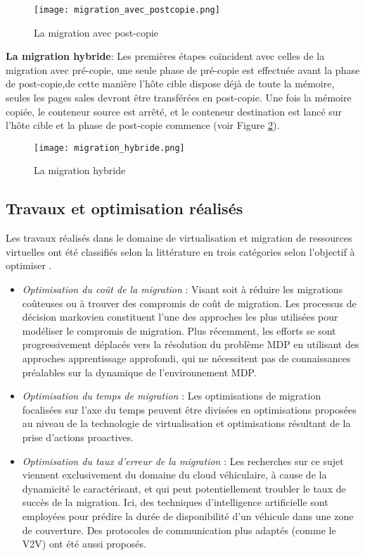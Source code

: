 \begin{figure}[H]
\centering
\texttt{[image: migration\_avec\_postcopie.png]}
\caption{La migration avec post-copie \cite{puliafito2019}}
\label{fig:migration_avec_postcopie2}
\end{figure}
\textbf{La migration hybride}: Les premières étapes coïncident avec celles de la migration avec pré-copie, une seule phase de pré-copie est effectuée avant la phase de post-copie,de cette manière l'hôte cible dispose déjà de toute la mémoire, seules les pages sales devront être transférées en post-copie. Une fois la mémoire copiée, le conteneur source est arrêté, et le conteneur destination est lancé sur l'hôte cible et la phase de post-copie commence \cite{wikimigration} (voir Figure \ref{fig:migration_hybride}).
\begin{figure}[H]
\centering
\texttt{[image: migration\_hybride.png]}
\caption{La migration hybride \cite{puliafito2019}}
\label{fig:migration_hybride}
\end{figure}

\subsection{Travaux et optimisation réalisés}
Les travaux réalisés dans le domaine de virtualisation et migration de ressources virtuelles ont été classifiés selon la littérature en trois catégories selon l'objectif à optimiser \cite{rejiba2019}.
\begin{itemize}
  \item \emph{Optimisation du coût de la migration} : Visant soit à réduire les migrations coûteuses ou à trouver des compromis de coût de migration. Les processus de décision markovien constituent l'une des approches les plus utilisées pour modéliser le compromis de migration. Plus récemment, les efforts se sont progressivement déplacés vers la résolution du problème MDP en utilisant des approches apprentissage approfondi, qui ne nécessitent pas de connaissances préalables sur la dynamique de l'environnement MDP.
  \item \emph{Optimisation du temps de migration} : Les optimisations de migration focalisées sur l'axe du temps peuvent être divisées en optimisations proposées au niveau de la technologie de virtualisation et optimisations résultant de la prise d'actions proactives.
  \item \emph{Optimisation du taux d'erreur de la migration} : Les recherches sur ce sujet viennent exclusivement du domaine du cloud véhiculaire, à cause de la dynamicité le caractérisant, et qui peut potentiellement troubler le taux de succès de la migration. Ici, des techniques d'intelligence artificielle sont employées pour prédire la durée de disponibilité d'un véhicule dans une zone de couverture. Des protocoles de communication plus adaptés (comme le V2V) ont été aussi proposés.
\end{itemize}

